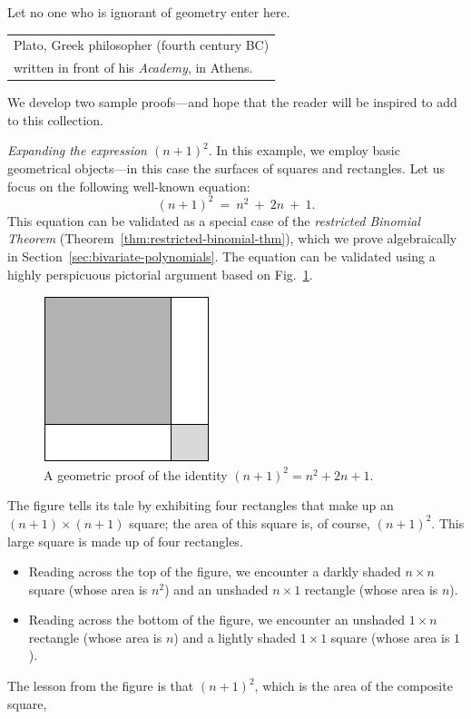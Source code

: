 \medskip



Let no one who is ignorant of geometry enter here.

\hspace*{2in} {\small \begin{tabular}{l}
Plato, Greek philosopher (fourth century BC) \\
written in front of his \textit{Academy}, in Athens. 
\end{tabular} }

\medskip

\noindent
We develop two sample proofs---and hope that the reader will be inspired to add to this collection.

\medskip

 {\it Expanding the expression $(n+1)^2$}.
In this example, we employ basic geometrical objects---in this case the surfaces of squares and rectangles.  Let us focus on the following well-known equation:
\begin{equation}
(n+1)^2 \ = \ n^2 \ + \ 2n \ + \ 1.
\end{equation}
This equation can be validated as a special case of the {\em restricted Binomial Theorem}
(Theorem~\ref{thm:restricted-binomial-thm}), which we prove algebraically in Section~\ref{sec:bivariate-polynomials}.  The equation can be validated using a highly perspicuous pictorial argument based on Fig.~\ref{fig:proofa2plusb2}.
\begin{figure}[ht]
\begin{center}
       \includegraphics[scale=0.4]{FiguresMaths/proofa2plusb2}
\caption{A geometric proof of the identity $(n+1)^2 = n^2 + 2n + 1$.}
       \label{fig:proofa2plusb2}
\end{center}
\end{figure}
The figure tells its tale by exhibiting four rectangles that make up an $(n+1) \times (n+1)$ square; the area of this square is, of course, $(n+1)^2$.  This large square is made up of four rectangles.
\begin{itemize}
\item
Reading across the top of the figure, we encounter a darkly shaded $n \times n$ square (whose area is $n^2$) and an unshaded $n \times 1$ rectangle (whose area is $n$).
\medskip\item
Reading across the bottom of the figure, we encounter an unshaded $1 \times n$ rectangle (whose area is $n$) and a lightly shaded $1 \times 1$ square (whose area is $1$).
\end{itemize}
The lesson from the figure is that $(n+1)^2$, which is the area of the composite square,

